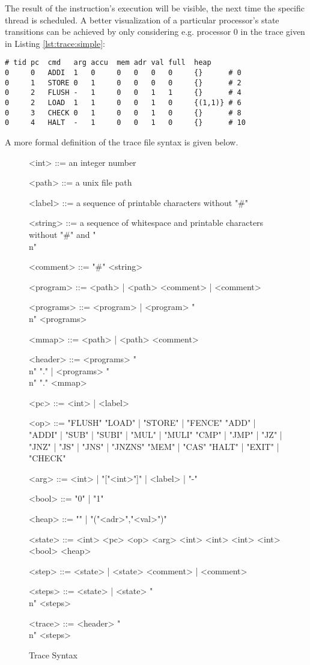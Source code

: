 The result of the instruction's execution will be visible, the next time the specific thread is scheduled.
A better visualization of a particular processor's state transitions can be achieved by only considering e.g. processor 0 in the trace given in Listing \ref{lst:trace:simple}:

\begin{lstlisting}[language={[concubine]Assembler}, xleftmargin=\parindent]
# tid pc  cmd   arg accu  mem adr val full  heap
0     0   ADDI  1   0     0   0   0   0     {}      # 0
0     1   STORE 0   1     0   0   0   0     {}      # 2
0     2   FLUSH -   1     0   0   1   1     {}      # 4
0     2   LOAD  1   1     0   0   1   0     {(1,1)} # 6
0     3   CHECK 0   1     0   0   1   0     {}      # 8
0     4   HALT  -   1     0   0   1   0     {}      # 10
\end{lstlisting}

A more formal definition of the trace file syntax is given below.

\begin{figure}[h]
\begin{grammar}
\footnotesize

<int> ::= an integer number

<path> ::= a unix file path

<label> ::= a sequence of printable characters without "#"

<string> ::= a sequence of whitespace and printable characters without "#" and "\\n"

<comment> ::= "#" <string>

<program> ::= <path> | <path> <comment> | <comment>

<programs> ::= <program> | <program> "\\n" <programs>

<mmap> ::= <path> | <path> <comment>

<header> ::= <programs> "\\n" "." | <programs> "\\n" "." <mmap>

<pc> ::= <int> | <label>

<op> ::= "FLUSH"
\alt "LOAD" | "STORE" | "FENCE"
\alt "ADD" | "ADDI" | "SUB" | "SUBI" | "MUL" | "MULI"
\alt "CMP" | "JMP" | "JZ" | "JNZ" | "JS" | "JNS" | "JNZNS"
\alt "MEM" | "CAS"
\alt "HALT" | "EXIT" | "CHECK"

<arg> ::= <int> | "["<int>"]" | <label> | "-"

<bool> ::= "0" | "1"

<heap> ::= "{}" | "{("<adr>","<val>")}"

<state> ::= <int> <pc> <op> <arg> <int> <int> <int> <int> <bool> <heap>

<step> ::= <state> | <state> <comment> | <comment>

<steps> ::= <state> | <state> "\\n" <steps>

<trace> ::= <header> "\\n" <steps>
\end{grammar}
\caption{Trace Syntax}
\label{fig:syntax:trace}
\end{figure}

